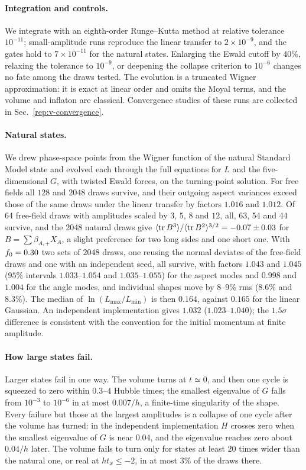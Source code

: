 \paragraph{Integration and controls.}
We integrate with an eighth-order Runge--Kutta method at relative tolerance $10^{-11}$; small-amplitude runs reproduce the linear transfer to $2\times10^{-9}$, and the gates hold to $7\times10^{-11}$ for the natural states. %
Enlarging the Ewald cutoff by $40\%$, relaxing the tolerance to $10^{-9}$, or deepening the collapse criterion to $10^{-6}$ changes no fate among the draws tested. %
The evolution is a truncated Wigner approximation: it is exact at linear order and omits the Moyal terms, and the volume and inflaton are classical.
Convergence studies of these runs are collected in Sec.~\ref{rep:v-convergence}.

\paragraph{Natural states.}
We drew phase-space points from the Wigner function of the natural Standard Model state and evolved each through the full equations for $L$ and the five-dimensional $G$, with twisted Ewald forces, on the turning-point solution.
For free fields all $128$ and $2048$ draws survive, and their outgoing aspect variances exceed those of the same draws under the linear transfer by factors $1.016$ and $1.012$. %
Of 64 free-field draws with amplitudes scaled by $3$, $5$, $8$ and $12$, all, $63$, $54$ and $44$ survive, and the 2048 natural draws give $\langle\operatorname{tr} B^3\rangle/\langle\operatorname{tr} B^2\rangle^{3/2}=-0.07\pm0.03$ for $B=\sum\beta_{A,+}X_A$, a slight preference for two long sides and one short one. %
With $f_0=0.30$ two sets of $2048$ draws, one reusing the normal deviates of the free-field draws and one with an independent seed, all survive, with factors $1.043$ and $1.045$ ($95\%$ intervals $1.033$--$1.054$ and $1.035$--$1.055$) for the aspect modes and $0.998$ and $1.004$ for the angle modes, and individual shapes move by $8$--$9\%$ rms ($8.6\%$ and $8.3\%$). %
The median of $\ln(L_{\max}/L_{\min})$ is then $0.164$, against $0.165$ for the linear Gaussian. %
An independent implementation gives $1.032$ ($1.023$--$1.040$); the $1.5\sigma$ difference is consistent with the convention for the initial momentum at finite amplitude. %

\paragraph{How large states fail.}
Larger states fail in one way.
The volume turns at $t\simeq0$, and then one cycle is squeezed to zero within $0.3$--$4$ Hubble times; the smallest eigenvalue of $G$ falls from $10^{-3}$ to $10^{-6}$ in at most $0.007/h$, a finite-time singularity of the shape. %
Every failure but those at the largest amplitudes is a collapse of one cycle after the volume has turned: in the independent implementation $H$ crosses zero when the smallest eigenvalue of $G$ is near $0.04$, and the eigenvalue reaches zero about $0.04/h$ later. %
The volume fails to turn only for states at least $20$ times wider than the natural one, or real at $ht_x\leq-2$, in at most $3\%$ of the draws there. %

